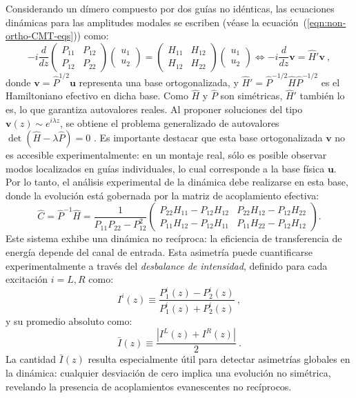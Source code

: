 Considerando un dímero compuesto por dos guías no idénticas, las ecuaciones dinámicas para las amplitudes modales se escriben (véase la ecuación~(\ref{eqn:non-ortho-CMT-eqs})) como:
\begin{equation}
	-i
	\frac{d}{dz}
	\begin{pmatrix}
		P_{11} & P_{12} \\
		P_{12} & P_{22}
	\end{pmatrix}
	\begin{pmatrix}
		u_1 \\
		u_2
	\end{pmatrix}
	=
	\begin{pmatrix}
		H_{11} & H_{12} \\
		H_{12} & H_{22}
	\end{pmatrix}
	\begin{pmatrix}
		u_1 \\
		u_2
	\end{pmatrix}
	\iff
	-i\frac{d}{dz}\textbf{v} = \hat{H}' \textbf{v} \ ,
\end{equation}
donde \( \textbf{v} = \hat{P}^{1/2} \textbf{u} \) representa una base ortogonalizada, y \( \hat{H}' = \hat{P}^{-1/2} \hat{H} \hat{P}^{-1/2} \) es el Hamiltoniano efectivo en dicha base. Como \( \hat{H} \) y \( \hat{P} \) son simétricas, \( \hat{H}' \) también lo es, lo que garantiza autovalores reales. Al proponer soluciones del tipo \( \textbf{v}(z) \sim e^{i\lambda z} \), se obtiene el problema generalizado de autovalores $\det(\hat{H} - \lambda \hat{P}) = 0$ .
Es importante destacar que esta base ortogonalizada \( \textbf{v} \) no es accesible experimentalmente: en un montaje real, sólo es posible observar modos localizados en guías individuales, lo cual corresponde a la base física \( \textbf{u} \). Por lo tanto, el análisis experimental de la dinámica debe realizarse en esta base, donde la evolución está gobernada por la matriz de acoplamiento efectiva:
\begin{equation}
	\hat{C} = \hat{P}^{-1} \hat{H} = \frac{1}{P_{11}P_{22} - P_{12}^2}
	\begin{pmatrix}
		P_{22}H_{11} - P_{12}H_{12} & P_{22}H_{12} - P_{12}H_{22} \\
		P_{11}H_{12} - P_{12}H_{11} & P_{11}H_{22} - P_{12}H_{12}
	\end{pmatrix}.
\end{equation}
Este sistema exhibe una dinámica no recíproca: la eficiencia de transferencia de energía depende del canal de entrada. Esta asimetría puede cuantificarse experimentalmente a través del \textit{desbalance de intensidad}, definido para cada excitación \( i = L, R \) como:
\begin{equation}
	I^i(z) \equiv \frac{P^i_1(z) - P^i_2(z)}{P^i_1(z) + P^i_2(z)} \ ,
\end{equation}
y su promedio absoluto como:
\begin{equation}
	\bar{I}(z) \equiv \frac{|I^L(z) + I^R(z)|}{2} \ .
\end{equation}
La cantidad \( \bar{I}(z) \) resulta especialmente útil para detectar asimetrías globales en la dinámica: cualquier desviación de cero implica una evolución no simétrica, revelando la presencia de acoplamientos evanescentes no recíprocos.


